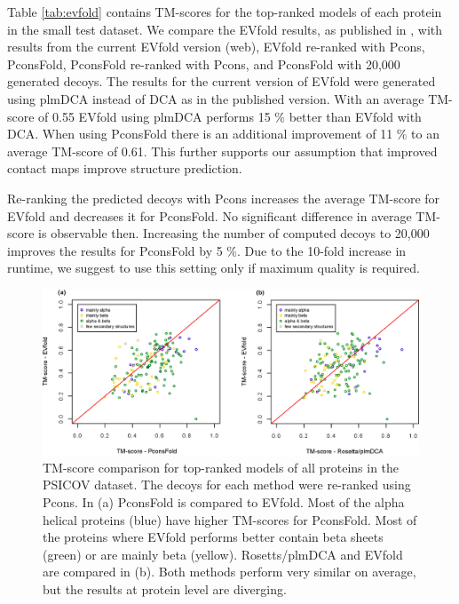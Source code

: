\documentclass{bioinfo}
\begin{document}
Table \ref{tab:evfold} contains TM-scores for the top-ranked models of each protein in the small test dataset. We compare the EVfold results, as published in \citeauthor{marks_protein_2011} \citeyear{marks_protein_2011}, with results from the current EVfold version (web), EVfold re-ranked with Pcons, PconsFold, PconsFold re-ranked with Pcons, and PconsFold with 20,000 generated decoys. The results for the current version of EVfold were generated using plmDCA instead of DCA as in the published version. With an average TM-score of 0.55 EVfold using plmDCA performs 15 \% better than EVfold with DCA. When using PconsFold there is an additional improvement of 11 \% to an average TM-score of 0.61. This further supports our assumption that improved contact maps improve structure prediction. 

Re-ranking the predicted decoys with Pcons increases the average TM-score for EVfold and decreases it for PconsFold. No significant difference in average TM-score is observable then. Increasing the number of computed decoys to 20,000 improves the results for PconsFold by 5 \%. Due to the 10-fold increase in runtime, we suggest to use this setting only if maximum quality is required.


\begin{figure}[!tpb]%
\centerline{\includegraphics[scale=0.7]{figures/vs.eps}}
\caption{TM-score comparison for top-ranked models of all proteins in the PSICOV dataset. The decoys for each method were re-ranked using Pcons. In (a) PconsFold is compared to EVfold. Most of the alpha helical proteins (blue) have higher TM-scores for PconsFold. Most of the proteins where EVfold performs better contain beta sheets (green) or are mainly beta (yellow). Rosetts/plmDCA and EVfold are compared in (b). Both methods perform very similar on average, but the results at protein level are diverging.}\label{fig:vs}
\end{figure}
\end{document}
